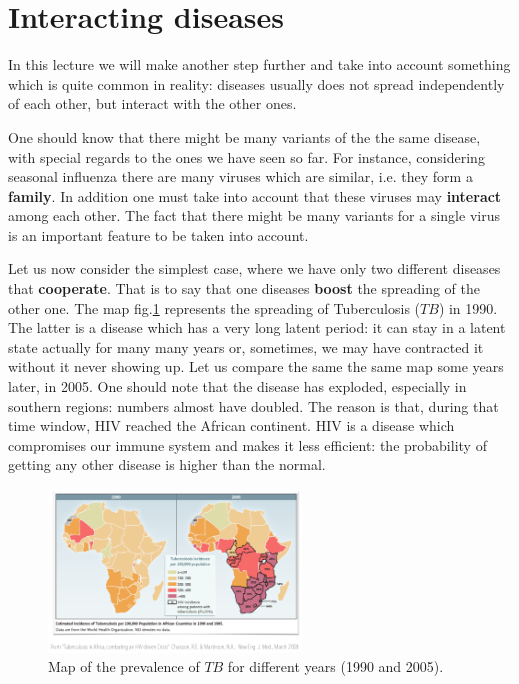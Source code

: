 \documentclass[../main/main.tex]{subfiles}
\begin{document}
\section{Interacting diseases}


In this lecture we will make another step further and take into account something which is quite common in reality: diseases usually does not spread independently of each other, but interact with the other ones.

One should know that there might be many variants of the the same disease, with special regards to the ones we have seen so far. For instance, considering seasonal influenza there are many viruses which are similar, i.e. they form a \textbf{family}. In addition one must take into account that these viruses may \textbf{interact} among each other. The fact that there might be many variants for a single virus is an important feature to be taken into account.

Let us now consider the simplest case, where we have only two different diseases that \textbf{cooperate}. That is to say that one diseases \textbf{boost} the spreading of the other one. The map fig.\ref{fig:11_001} represents the spreading of Tuberculosis ($TB$) in 1990. The latter is a disease which has a very long latent period: it can stay in a latent state actually for many many years or, sometimes, we may have contracted it without it never showing up. Let us compare the same the same map some years later, in 2005. One should note that the disease has exploded, especially in southern regions: numbers almost have doubled. The reason is that, during that time window, HIV reached the African continent. HIV is a disease which compromises our immune system and makes it less efficient: the probability of getting any other disease is higher than the normal.

\begin{figure}[h!]
\centering
\includegraphics[width=0.6\textwidth]{../lessons/image/11/image001.png}
\caption{\label{fig:11_001} Map of the prevalence of $TB$ for different years (1990 and 2005).}
\end{figure}
\end{document}
